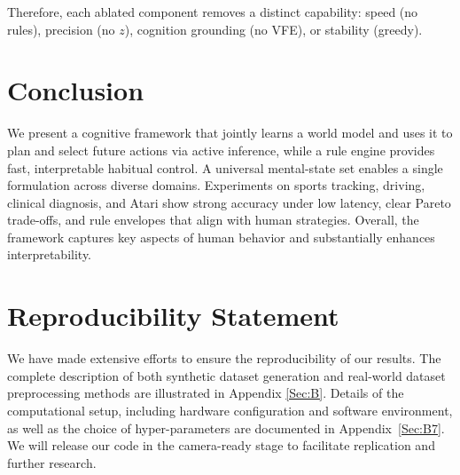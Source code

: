 \documentclass{article} %
\begin{document}
Therefore, each ablated component removes a distinct capability: speed (no rules), precision (no $z$), cognition grounding (no VFE), or stability (greedy).

\section{Conclusion}
\label{sec:conclusion}
\vspace{-5pt}
We present a cognitive framework that jointly learns a world model and uses it to plan and select future actions via active inference, while a rule engine provides fast, interpretable habitual control. A universal mental-state set enables a single formulation across diverse domains. Experiments on sports tracking, driving, clinical diagnosis, and Atari show strong accuracy under low latency, clear Pareto trade-offs, and rule envelopes that align with human strategies. Overall, the framework captures key aspects of human behavior and substantially enhances interpretability.

\clearpage

\section*{Reproducibility Statement} We have made extensive efforts to ensure the reproducibility of our results. The complete description of both synthetic dataset generation and real-world dataset preprocessing methods are illustrated in Appendix \ref{Sec:B}. Details of the computational setup, including hardware configuration and software environment, as well as the choice of hyper-parameters are documented in Appendix~\ref{Sec:B7}. We will release our code in the camera-ready stage to facilitate replication and further research.





\newpage
\appendix
\end{document}
